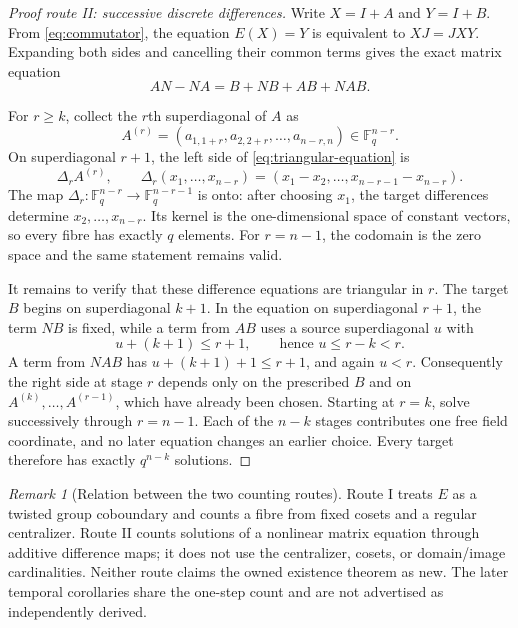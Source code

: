 \documentclass[10pt,a4paper]{amsart}
\theoremstyle{definition}
\theoremstyle{remark}
\newtheorem{remark}[theorem]{Remark}
\newcommand{\F}{\mathbb F}
\begin{document}
\begin{proof}[Proof route II: successive discrete differences]
Write $X=I+A$ and $Y=I+B$.  From \eqref{eq:commutator}, the equation
$E(X)=Y$ is equivalent to $XJ=JXY$.  Expanding both sides and cancelling
their common terms gives the exact matrix equation
\begin{equation}
             AN-NA=B+NB+AB+NAB.
 \label{eq:triangular-equation}
\end{equation}

For $r\ge k$, collect the $r$th superdiagonal of $A$ as
\[
 A^{(r)}=(a_{1,1+r},a_{2,2+r},\ldots,a_{n-r,n})\in\F_q^{n-r}.
\]
On superdiagonal $r+1$, the left side of \eqref{eq:triangular-equation} is
\begin{equation}
 \Delta_r A^{(r)},\qquad
 \Delta_r(x_1,\ldots,x_{n-r})
       =(x_1-x_2,\ldots,x_{n-r-1}-x_{n-r}).
 \label{eq:difference}
\end{equation}
The map $\Delta_r:\F_q^{n-r}\to\F_q^{n-r-1}$ is onto: after choosing
$x_1$, the target differences determine $x_2,\ldots,x_{n-r}$.  Its kernel
is the one-dimensional space of constant vectors, so every fibre has
exactly $q$ elements.  For $r=n-1$, the codomain is the zero space and the
same statement remains valid.

It remains to verify that these difference equations are triangular in
$r$.  The target $B$ begins on superdiagonal $k+1$.  In the equation on
superdiagonal $r+1$, the term $NB$ is fixed, while a term from $AB$ uses a
source superdiagonal $u$ with
\[
               u+(k+1)\le r+1,
               \qquad\text{hence }u\le r-k<r.
\]
A term from $NAB$ has $u+(k+1)+1\le r+1$, and again $u<r$.
Consequently the right side at stage $r$ depends only on the prescribed
$B$ and on $A^{(k)},\ldots,A^{(r-1)}$, which have already been chosen.
Starting at $r=k$, solve successively through $r=n-1$.  Each of the
$n-k$ stages contributes one free field coordinate, and no later equation
changes an earlier choice.  Every target therefore has exactly
$q^{n-k}$ solutions.
\end{proof}

\begin{remark}[Relation between the two counting routes]
Route I treats $E$ as a twisted group coboundary and counts a fibre from
fixed cosets and a regular centralizer.  Route II counts solutions of a
nonlinear matrix equation through additive difference maps; it does not use
the centralizer, cosets, or domain/image cardinalities.  Neither route claims
the owned existence theorem as new.  The later temporal corollaries share
the one-step count and are not advertised as independently derived.
\end{remark}
\end{document}
